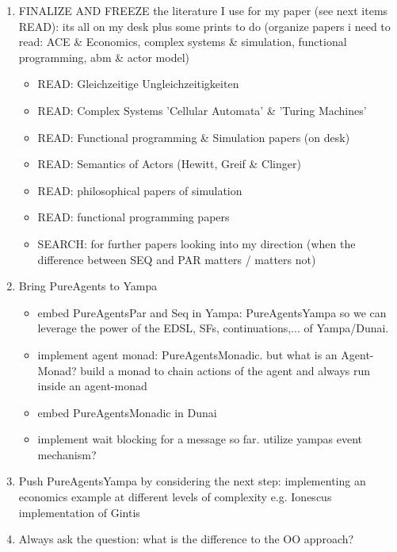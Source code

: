\begin{enumerate}
\item FINALIZE AND FREEZE the literature I use for my paper (see next items READ): its all on my desk plus some prints to do (organize papers i need to read: ACE \& Economics, complex systems \& simulation, functional programming, abm \& actor model)
	\begin{itemize}
		\item READ: Gleichzeitige Ungleichzeitigkeiten
		\item READ: Complex Systems 'Cellular Automata' \& 'Turing Machines'
		\item READ: Functional programming \& Simulation papers (on desk)
		\item READ: Semantics of Actors (Hewitt, Greif \& Clinger)
		\item READ: philosophical papers of simulation
		\item READ: functional programming papers
		\item SEARCH: for further papers looking into my direction (when the difference between SEQ and PAR matters / matters not)
	\end{itemize}


\item Bring PureAgents to Yampa
	\begin{itemize}
		\item embed PureAgentsPar and Seq in Yampa: PureAgentsYampa so we can leverage the power of the EDSL, SFs, continuations,... of Yampa/Dunai.
		\item implement agent monad: PureAgentsMonadic. but what is an Agent-Monad? build a monad to chain actions of the agent and always run inside an agent-monad
		\item embed PureAgentsMonadic in Dunai
		\item implement wait blocking for a message so far. utilize yampas event mechanism?
	\end{itemize}
	
\item Push PureAgentsYampa by considering the next step: implementing an economics example at different levels of complexity e.g. Ionescus implementation of Gintis

\item Always ask the question: what is the difference to the OO approach? 
\end{enumerate} 

